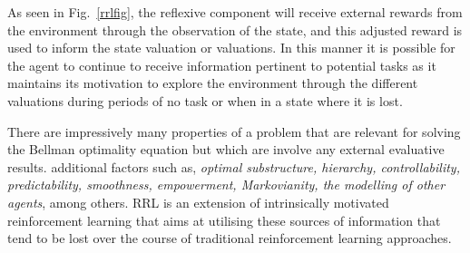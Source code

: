 \documentclass{article}
\begin{document}
As seen in Fig.~\ref{rrlfig}, the reflexive component will receive external rewards from the environment through the observation of the state, and this adjusted reward is used to inform the state valuation or valuations. In this manner it is possible for the agent to continue to receive information pertinent to potential tasks as it maintains its motivation to explore the environment through the different valuations during periods of no task or when in a state where it is lost.



There are impressively many properties of a problem that are relevant for solving the 
Bellman optimality equation but which are involve any external evaluative results.
additional factors such as, \emph{optimal substructure, hierarchy, controllability, predictability, smoothness, empowerment, Markovianity, the modelling of other agents}, among others. RRL is an extension of intrinsically motivated reinforcement learning that aims at utilising these sources of information that tend to be lost over the course of traditional reinforcement learning approaches. 
\end{document}
